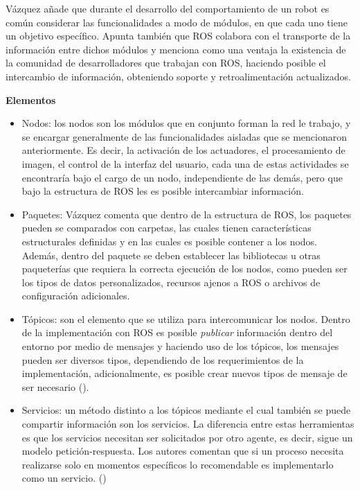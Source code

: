             Vázquez añade que durante el desarrollo del comportamiento de un robot es común considerar las funcionalidades a modo de módulos, en que cada uno tiene un objetivo específico. Apunta también que ROS colabora con el transporte de la información entre dichos módulos y menciona como una ventaja la existencia de la comunidad de desarrolladores que trabajan con ROS, haciendo posible el intercambio de información, obteniendo soporte y retroalimentación actualizados. \phantom{saltodelineaforzado >:D\\}

            \textbf{Elementos}
            \begin{itemize}
                \item Nodos: los nodos son los módulos que en conjunto forman la red le trabajo, y se encargar generalmente de las funcionalidades aisladas que se mencionaron anteriormente. Es decir, la activación de los actuadores, el procesamiento de imagen, el control de la interfaz del usuario, cada una de estas actividades se encontraría bajo el cargo de un nodo, independiente de las demás, pero que bajo la estructura de ROS les es posible intercambiar información.
                \item Paquetes: Vázquez comenta que dentro de la estructura de ROS, los paquetes pueden se comparados con carpetas, las cuales tienen características estructurales definidas y en las cuales es posible contener a los nodos. Además, dentro del paquete se deben establecer las bibliotecas u otras paqueterías que requiera la correcta ejecución de los nodos, como pueden ser los tipos de datos personalizados, recursos ajenos a ROS o archivos de configuración adicionales. 
                \item Tópicos: son el elemento que se utiliza para intercomunicar los nodos. Dentro de la implementación con ROS es posible \textit{publicar} información dentro del entorno por medio de mensajes y haciendo uso de los tópicos, los mensajes pueden ser diversos tipos, dependiendo de los requerimientos de la implementación, adicionalmente, es posible crear nuevos tipos de mensaje de ser necesario (\cite{ros_wiki_std_msgs}). 
                \item Servicios: un método distinto a los tópicos mediante el cual también se puede compartir información son los servicios. La diferencia entre estas herramientas es que los servicios necesitan ser solicitados por otro agente, es decir, sigue un modelo petición-respuesta. Los autores comentan que si un proceso necesita realizarse solo en momentos específicos lo recomendable es implementarlo como un servicio. (\cite{vazquez_silva_desarrollo_2018})
            \end{itemize}

